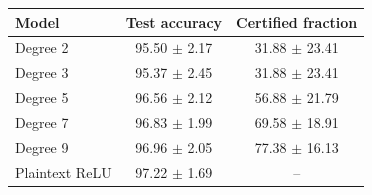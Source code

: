 \begin{tabular}{lcc}
\toprule
Model & Test accuracy & Certified fraction \\
\midrule
Degree 2 & 95.50 $\pm$ 2.17 & 31.88 $\pm$ 23.41 \\
Degree 3 & 95.37 $\pm$ 2.45 & 31.88 $\pm$ 23.41 \\
Degree 5 & 96.56 $\pm$ 2.12 & 56.88 $\pm$ 21.79 \\
Degree 7 & 96.83 $\pm$ 1.99 & 69.58 $\pm$ 18.91 \\
Degree 9 & 96.96 $\pm$ 2.05 & 77.38 $\pm$ 16.13 \\
Plaintext ReLU & 97.22 $\pm$ 1.69 & -- \\
\bottomrule
\end{tabular}
